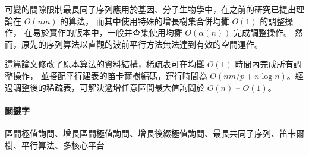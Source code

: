 \begin{abstractCH}

可變的間隙限制最長同子序列應用於基因、分子生物學中，在之前的研究已提出理論在 $O(nm)$ 的算法，
而其中使用特殊的增長樹集合併均攤 $O(1)$ 的調整操作，
在易於實作的版本中，一般并查集使用均攤 $O(\alpha(n))$ 完成調整操作。
然而，原先的序列算法以直觀的波前平行方法無法達到有效的空間運作。

這篇論文修改了原本算法的資料結構，稀疏表可在均攤 $O(1)$ 時間內完成所有調整操作，
並搭配平行建表的笛卡爾樹編碼，運行時間為 $O(nm / p + n \log n)$。經過調整後的稀疏表，可解決遞增任意區間最大值詢問於 $O(n)$ -- $O(1)$。

\paragraph{關鍵字} 
區間極值詢問、增長區間極值詢問、增長後綴極值詢問、最長共同子序列、笛卡爾樹、平行算法、多核心平台

\end{abstractCH}